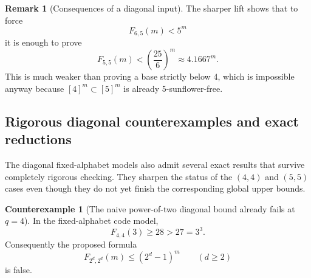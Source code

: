 \documentclass[11pt]{article}
\theoremstyle{definition}
\newtheorem{counterexample}[theorem]{Counterexample}
\newtheorem{remark}[theorem]{Remark}
\newcommand{\1}{\mathbf{1}}
\begin{document}
\begin{remark}[Consequences of a diagonal input]
The sharper lift shows that to force
\[
F_{6,5}(m)<5^m
\]
it is enough to prove
\[
F_{5,5}(m)<\left(\frac{25}{6}\right)^m\approx 4.1667^m.
\]
This is much weaker than proving a base strictly below $4$, which is impossible anyway because $[4]^m\subset[5]^m$ is already 5-sunflower-free.
\end{remark}


\subsection{Rigorous diagonal counterexamples and exact reductions}\label{subsec:exact-diagonal-reductions}
The diagonal fixed-alphabet models also admit several exact results that survive completely rigorous checking. They sharpen the status of the $(4,4)$ and $(5,5)$ cases even though they do not yet finish the corresponding global upper bounds.

\begin{counterexample}[The naive power-of-two diagonal bound already fails at $q=4$]\label{ce:444-power-of-two-false}
In the fixed-alphabet code model,
\[
F_{4,4}(3)\ge 28>27=3^3.
\]
Consequently the proposed formula
\[
F_{2^d,2^d}(m)\le (2^d-1)^m
\qquad(d\ge 2)
\]
is false.
\end{counterexample}
\end{document}
